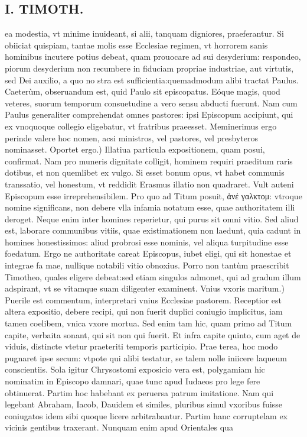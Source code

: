 \documentclass{article}
\begin{document}
\begin{pages}
\section*{I. TIMOTH. }
\marginpar{[ p.32 ]}\pstart ea modestia, vt minime inuideant, si alii, tanquam digniores, praeferantur. Si obiiciat quispiam, tantae molis esse Ecclesiae regimen, vt horrorem sanis hominibus incutere potius debeat, quam prouocare ad sui desyderium: respondeo, piorum desyderium non recumbere in fiduciam propriae industriae, aut virtutis, sed Dei auxilio, a quo no stra est sufficientia:quemadmodum alibi tractat Paulus. Caeterùm, obseruandum est, quid Paulo sit episcopatus. Eóque magis, quod veteres, suorum temporum consuetudine a vero sensu abducti fuerunt. Nam cum Paulus generaliter comprehendat omnes pastores: ipsi Episcopum accipiunt, qui ex vnoquoque collegio eligebatur, vt fratribus praeesset. Meminerimus ergo perinde valere hoc nomen, acsi ministros, vel pastores, vel presbyteros nominasset.  \pend\pstart Oportet ergo.) Illatiua particula expositionem, quam posui, confirmat. Nam pro muneris dignitate colligit, hominem requiri praeditum raris dotibus, et non quemlibet ex vulgo. Si esset bonum opus, vt habet communis transsatio, vel honestum, vt reddidit Erasmus illatio non quadraret. Vult auteni Episcopum esse irreprehensibilem. Pro quo ad Titum posuit, ἀνέ γαλκτομ: vtroque nomine significans, non debere vlla infamia notatum esse, quae authoritatem illi deroget. Neque enim inter homines reperietur, qui purus sit omni vitio. Sed aliud est, laborare communibus vitiis, quae existimationem non laedunt, quia cadunt in homines honestissimos: aliud probrosi esse nominis, vel aliqua turpitudine esse foedatum. Ergo ne authoritate careat Episcopus, iubet eligi, qui sit honestae et integrae fa mae, nullique notabili vitio obnoxius. Porro non tantùm praescribit Timotheo, quales eligere debeat:sed etiam singulos admonet, qui ad gradum illum adspirant, vt se vitamque suam diligenter examinent.  \pend\pstart Vnius vxoris maritum.) Puerile est commentum, interpretari vnius Ecclesiae pastorem. Receptior est altera expositio, debere recipi, qui non fuerit duplici coniugio implicitus, iam tamen coelibem, vnica vxore mortua. Sed enim tam hic, quam primo ad Titum capite, verbaita sonant, qui sit non qui fuerit. Et infra capite quinto, cum aget de viduis, distincte vtetur praeteriti temporis participio. Prae terea, hoc modo pugnaret ipse secum: vtpote qui alibi testatur, se talem nolle iniicere laqueum conscientiis. Sola igitur Chrysostomi exposicio vera est, polygamiam hic nominatim in Episcopo damnari, quae tunc apud Iudaeos pro lege fere obtinuerat. Partim hoc habebant ex peruersa patrum imitatione. Nam qui legebant Abraham, Iacob, Dauidem et similes, pluribus simul vxoribus fuisse coniugatos idem sibi quoque licere arbitrabantur. Partim hanc corruptelam ex vicinis gentibus traxerant. Nunquam enim apud Orientales qua  \pend

\end{pages}
\end{document}
